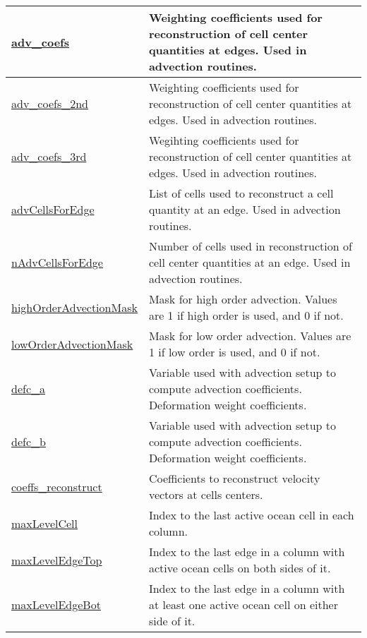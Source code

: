{\begin{center}
\begin{longtable}{| p{2.0in} | p{4.0in} |}
	\hline
	\hyperref[subsec:var_sec_mesh_adv_coefs]{adv\_coefs} & Weighting coefficients used for reconstruction of cell center quantities at edges. Used in advection routines. \\
	\hline
	\hyperref[subsec:var_sec_mesh_adv_coefs_2nd]{adv\_coefs\_2nd} & Weighting coefficients used for reconstruction of cell center quantities at edges. Used in advection routines. \\
	\hline
	\hyperref[subsec:var_sec_mesh_adv_coefs_3rd]{adv\_coefs\_3rd} & Wegihting coefficients used for reconstruction of cell center quantities at edges. Used in advection routines. \\
	\hline
	\hyperref[subsec:var_sec_mesh_advCellsForEdge]{advCellsForEdge} & List of cells used to reconstruct a cell quantity at an edge. Used in advection routines. \\
	\hline
	\hyperref[subsec:var_sec_mesh_nAdvCellsForEdge]{nAdvCellsForEdge} & Number of cells used in reconstruction of cell center quantities at an edge. Used in advection routines. \\
	\hline
	\hyperref[subsec:var_sec_mesh_highOrderAdvectionMask]{highOrderAdvectionMask} & Mask for high order advection. Values are 1 if high order is used, and 0 if not. \\
	\hline
	\hyperref[subsec:var_sec_mesh_lowOrderAdvectionMask]{lowOrderAdvectionMask} & Mask for low order advection. Values are 1 if low order is used, and 0 if not. \\
	\hline
	\hyperref[subsec:var_sec_mesh_defc_a]{defc\_a} & Variable used with advection setup to compute advection coefficients. Deformation weight coefficients. \\
	\hline
	\hyperref[subsec:var_sec_mesh_defc_b]{defc\_b} & Variable used with advection setup to compute advection coefficients. Deformation weight coefficients. \\
	\hline
	\hyperref[subsec:var_sec_mesh_coeffs_reconstruct]{coeffs\_reconstruct} & Coefficients to reconstruct velocity vectors at cells centers. \\
	\hline
	\hyperref[subsec:var_sec_mesh_maxLevelCell]{maxLevelCell} & Index to the last active ocean cell in each column. \\
	\hline
	\hyperref[subsec:var_sec_mesh_maxLevelEdgeTop]{maxLevelEdgeTop} & Index to the last edge in a column with active ocean cells on both sides of it. \\
	\hline
	\hyperref[subsec:var_sec_mesh_maxLevelEdgeBot]{maxLevelEdgeBot} & Index to the last edge in a column with at least one active ocean cell on either side of it. \\

\end{longtable}
\end{center}}
